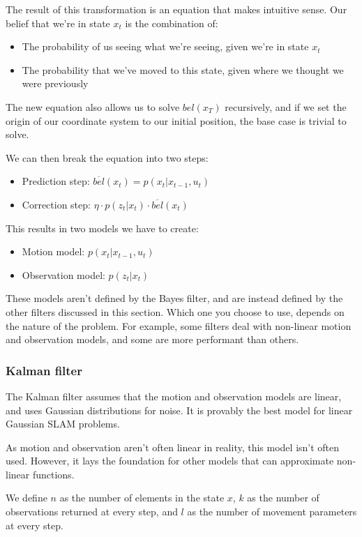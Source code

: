 \documentclass{article}
\begin{document}
The result of this transformation is an equation that makes intuitive sense.
Our belief that we're in state $x_t$ is the combination of:
\begin{itemize}
  \item The probability of us seeing what we're seeing, given we're in state
    $x_t$
  \item The probability that we've moved to this state, given where we thought
    we were previously
\end{itemize}

The new equation also allows us to solve $bel(x_T)$ recursively, and if we set
the origin of our coordinate system to our initial position, the base case is
trivial to solve.

We can then break the equation into two steps:
\begin{itemize}
  \item Prediction step:
    $\overline{bel}(x_t) = p(x_t \vert x_{t-1}, u_t)$
  \item Correction step:
    $\eta \cdot p(z_t \vert x_t) \cdot \overline{bel}(x_t)$
\end{itemize}
This results in two models we have to create:
\begin{itemize}
  \item Motion model: $p(x_t \vert x_{t-1}, u_t)$
  \item Observation model: $p(z_t \vert x_t)$
\end{itemize}

These models aren't defined by the Bayes filter, and are instead defined by the
other filters discussed in this section. Which one you choose to use, depends
on the nature of the problem. For example, some filters deal with non-linear
motion and observation models, and some are more performant than others.

\subsubsection{Kalman filter}

The Kalman filter assumes that the motion and observation models are linear,
and uses Gaussian distributions for noise. It is provably the best model for
linear Gaussian SLAM problems.

As motion and observation aren't often linear in reality, this model isn't
often used. However, it lays the foundation for other models that can
approximate non-linear functions.

We define $n$ as the number of elements in the state $x$, $k$ as the number of
observations returned at every step, and $l$ as the number of movement
parameters at every step.
\end{document}
